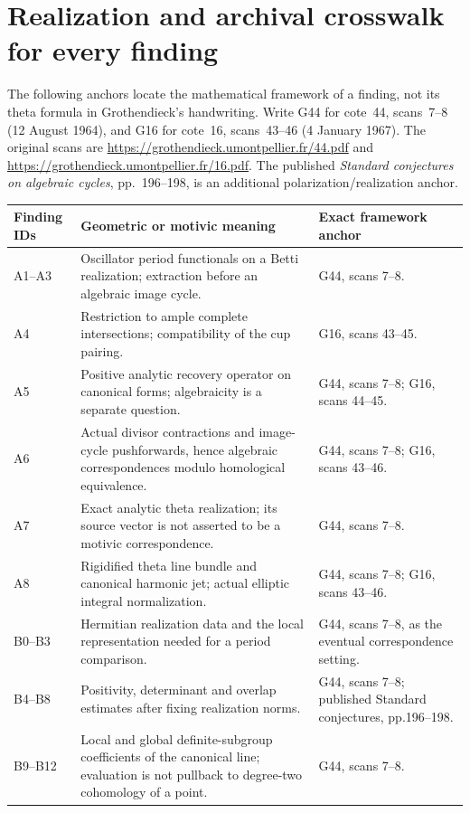 \appendix
\section{Realization and archival crosswalk for every finding}

The following anchors locate the mathematical framework of a
finding, not its theta formula in Grothendieck's handwriting.
Write G44 for cote~44, scans~7--8 (12 August 1964), and G16 for
cote~16, scans~43--46 (4 January 1967). The original scans are
\url{https://grothendieck.umontpellier.fr/44.pdf} and
\url{https://grothendieck.umontpellier.fr/16.pdf}.
The published \emph{Standard conjectures on algebraic cycles},
pp.~196--198, is an additional polarization/realization anchor.

\begin{longtable}{@{}p{.18\linewidth}p{.48\linewidth}p{.27\linewidth}@{}}
\toprule Finding IDs & Geometric or motivic meaning & Exact framework anchor\\\midrule\endhead
A1--A3 & Oscillator period functionals on a Betti realization; extraction before an algebraic image cycle. & G44, scans 7--8.\\
A4 & Restriction to ample complete intersections; compatibility of the cup pairing. & G16, scans 43--45.\\
A5 & Positive analytic recovery operator on canonical forms; algebraicity is a separate question. & G44, scans 7--8; G16, scans 44--45.\\
A6 & Actual divisor contractions and image-cycle pushforwards, hence algebraic correspondences modulo homological equivalence. & G44, scans 7--8; G16, scans 43--46.\\
A7 & Exact analytic theta realization; its source vector is not asserted to be a motivic correspondence. & G44, scans 7--8.\\
A8 & Rigidified theta line bundle and canonical harmonic jet; actual elliptic integral normalization. & G44, scans 7--8; G16, scans 43--46.\\
B0--B3 & Hermitian realization data and the local representation needed for a period comparison. & G44, scans 7--8, as the eventual correspondence setting.\\
B4--B8 & Positivity, determinant and overlap estimates after fixing realization norms. & G44, scans 7--8; published Standard conjectures, pp.196--198.\\
B9--B12 & Local and global definite-subgroup coefficients of the canonical line; evaluation is not pullback to degree-two cohomology of a point. & G44, scans 7--8.\\

\end{longtable}
